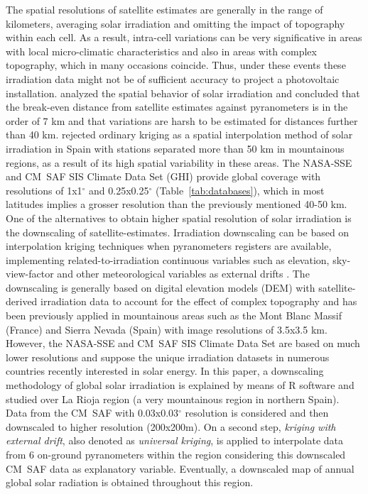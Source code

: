 \documentclass[authoryear, sort&compress]{elsarticle}
\begin{document}
The spatial resolutions of satellite estimates are generally in the
range of kilometers, averaging solar irradiation and omitting the
impact of topography within each cell. As a result, intra-cell
variations can be very significative in areas with local
micro-climatic characteristics and also in areas with complex
topography, which in many occasions coincide. Thus, under these events
these irradiation data might not be of sufficient accuracy to project
a photovoltaic installation. \cite{Perez.Seals.ea1994} analyzed the
spatial behavior of solar irradiation and concluded that the
break-even distance from satellite estimates against pyranometers is
in the order of 7 km and that variations are harsh to be estimated for
distances further than 40
km. \cite{Antonanzas-Torres.Canizares.ea2013} rejected ordinary
kriging as a spatial interpolation method of solar irradiation in
Spain with stations separated more than 50 km in mountainous regions,
as a result of its high spatial variability in these areas. The
NASA-SSE and CM~SAF SIS Climate Data Set (GHI) provide global coverage
with resolutions of 1x1$^\circ$ and 0.25x0.25$^\circ$
(Table~\ref{tab:databases}), which in most latitudes implies a grosser
resolution than the previously mentioned 40-50 km. One of the
alternatives to obtain higher spatial resolution of solar irradiation
is the downscaling of satellite-estimates. Irradiation downscaling can
be based on interpolation kriging techniques when pyranometers
registers are available, implementing related-to-irradiation
continuous variables such as elevation, sky-view-factor and other
meteorological variables as external drifts
\citep{Alsamamra.Ruiz-Arias.ea2009, Batlles.Bosch.ea2008}. The
downscaling is generally based on digital elevation models (DEM) with
satellite-derived irradiation data to account for the effect of
complex topography and has been previously applied in mountainous
areas such as the Mont Blanc Massif (France) \citep{Corripio2003} and
Sierra Nevada (Spain) \citep{Bosch.Batlles.ea2010,Ruiz-Arias.Cebecauer.ea2010} with image resolutions of
3.5x3.5 km. However, the NASA-SSE and CM~SAF SIS Climate Data Set
are based on much lower resolutions and suppose the unique irradiation
datasets in numerous countries recently interested in solar energy.
In this paper, a downscaling methodology of global solar
irradiation is explained by means of R software
and studied over La Rioja region (a very mountainous region in
northern Spain). Data from the CM~SAF with 0.03x0.03$^\circ$
resolution is considered and then downscaled to higher resolution
(200x200m). On a second step, \emph{kriging with external
drift}, also denoted as \emph{universal kriging}, is applied to
interpolate data from 6 on-ground pyranometers within the region
considering this downscaled CM~SAF data as explanatory
variable. Eventually, a downscaled map of annual global solar
radiation is obtained throughout this region.
\end{document}
